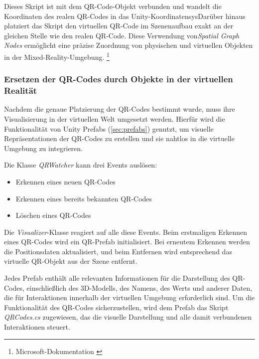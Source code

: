 Dieses Skript ist mit dem QR-Code-Objekt verbunden und wandelt die Koordinaten des realen QR-Codes in das Unity-KoordinatensysDarüber hinaus platziert das Skript den virtuellen QR-Code im Szenenaufbau exakt an der gleichen Stelle wie den realen QR-Code. Diese Verwendung von\textit{Spatial Graph Nodes} ermöglicht eine präzise Zuordnung von physischen und virtuellen Objekten in
der Mixed-Reality-Umgebung. \footnote{Microsoft-Dokumentation \cite{Spatial Graph Node}}

\subsubsection{\label{sec:qrvisualizer}Ersetzen der QR-Codes durch Objekte in der virtuellen Realität}
Nachdem die genaue Platzierung der QR-Codes bestimmt wurde, muss ihre Visualisierung in der virtuellen Welt umgesetzt werden. Hierfür wird die Funktionalität von Unity Prefabs (\ref{sec:prefabs}) genutzt, um visuelle Repräsentationen der QR-Codes zu erstellen und sie nahtlos in die virtuelle Umgebung zu integrieren.

Die Klasse \textit{QRWatcher} kann drei Events auslösen:
\begin{itemize}
    \item Erkennen eines neuen QR-Codes
    \item Erkennen eines bereits bekannten QR-Codes
    \item Löschen eines QR-Codes
\end{itemize}

Die \textit{Visualizer}-Klasse reagiert auf alle diese Events. Beim erstmaligen Erkennen eines QR-Codes wird ein QR-Prefab initialisiert. Bei erneutem Erkennen werden die Positionsdaten aktualisiert, und beim Entfernen wird entsprechend das virtuelle QR-Objekt aus der Szene entfernt.

Jedes Prefab enthält alle relevanten Informationen für die Darstellung des QR-Codes, einschließlich des 3D-Modells, des Namens, des Werts und anderer Daten, die für Interaktionen innerhalb der virtuellen Umgebung erforderlich sind. Um die Funktionalität des QR-Codes sicherzustellen, wird dem Prefab das Skript \textit{QRCodes.cs} zugewiesen, das die visuelle Darstellung und alle damit verbundenen Interaktionen steuert.


